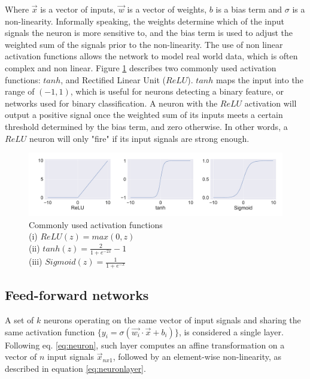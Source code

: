 Where \(\vec{x}\) is a vector of inputs, \(\vec{w}\) is a vector of weights, \(b\) is a bias term and \(\sigma\) is a non-linearity. Informally speaking, the weights determine which of the input signals the neuron is more sensitive to, and the bias term is used to adjust the weighted sum of the signals prior to the non-linearity. The use of non linear activation functions allows the network to model real world data, which is often complex and non linear. Figure \ref{fig:activations} describes two commonly used activation functions: $tanh$, and Rectified Linear Unit ($ReLU$). $tanh$ maps the input into the range of $(-1,1)$, which is useful for neurons detecting a binary feature, or networks used for binary classification. A neuron with the $ReLU$ activation will output a positive signal once the weighted sum of its inputs meets a certain threshold determined by the bias term, and zero otherwise. In other words, a $ReLU$ neuron will only "fire" if its input signals are strong enough. 

\begin{figure}
  \centering
    \includegraphics[width=\textwidth]{Figures/activations.pdf}
  \caption{
  Commonly used activation functions \\
  (i) $ ReLU(z) = max(0, z) $\\ 
  (ii) $ tanh(z) = \frac{2}{1 + e^{-2x}} - 1 $ \\
  (iii) $ Sigmoid(z) = \frac{1}{1 + e^{-x}} $ \\
  }
  \label{fig:activations}
\end{figure}

\subsection{Feed-forward networks}

A set of \(k\) neurons operating on the same vector of input signals and sharing the same activation function \(\{y_i = \sigma(\vec{w_i}\cdot\vec{x} + b_i)\}\), is considered a single layer. Following eq. \ref{eq:neuron}, such layer computes an affine transformation on a vector of \(n\) input signals  \(\vec{x}_{nx1}\), followed by an element-wise non-linearity, as described in equation \ref{eq:neuronlayer}. 

